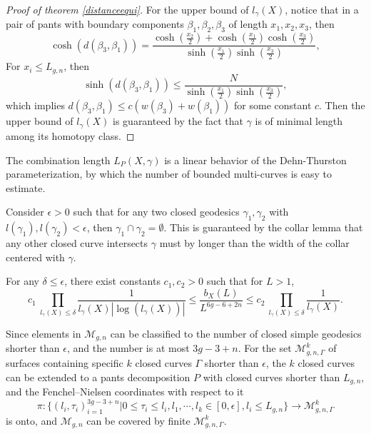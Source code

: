 \begin{proof}[Proof of theorem \ref{distanceequi}]
For the upper bound of $l_\gamma(X)$, notice that in a pair of pants with boundary components $\beta_1,\beta_2,\beta_3$ of length $x_1,x_2,x_3$, then
$$
\cosh(d(\beta_3,\beta_1))=\frac{\cosh(\frac{x_2}{2})+\cosh(\frac{x_1}{2})\cosh(\frac{x_3}{2})}{\sinh(\frac{x_1}{2})\sinh(\frac{x_3}{2})},
$$
For $x_i\leq L_{g,n}$, then 
$$
\sinh(d(\beta_3,\beta_1))\leq \frac{N}{\sinh(\frac{x_1}{2})\sinh(\frac{x_3}{2})},
$$
which implies $d(\beta_3,\beta_1)\leq c(w(\beta_3)+w(\beta_1))$ for some constant $c$. Then the upper bound of $l_\gamma(X)$ is guaranteed by the fact that $\gamma$ is of minimal  length among its homotopy class.
\end{proof}

The combination length $L_P(X,\gamma)$  is a linear behavior of the Dehn-Thurston  parameterization, by which the number of bounded multi-curves is easy to estimate.

Consider $\epsilon>0$ such that  for any two closed geodesics $\gamma_1,\gamma_2$ with $l(\gamma_1),l(\gamma_2)<\epsilon$, then $\gamma_1\cap \gamma_2=\emptyset$. This is guaranteed by the collar lemma that any other closed curve intersects $\gamma$ must by  longer than the width of the collar centered with  $\gamma$.

\begin{lemma}\label{estimatebxl}
For any $\delta\leq \epsilon$, there exist constants   $c_1,c_2>0$ such that for $L>1$, \begin{equation}
  c_1\ \prod_{l_\gamma(X)\leq \delta}\frac{1}{l_\gamma(X)|\log(l_\gamma(X))|}  
  \leq 
 \frac{b_X(L)}{L^{6g-6+2n}}
  \leq
 c_2\ \prod_{l_\gamma(X)\leq \delta}\frac{1}{l_\gamma(X)}.
\end{equation}
\end{lemma}



Since elements in  $\mathscr{M}_{g,n}$ can be classified to the number of closed simple geodesics shorter than $\epsilon$, and the number is  at most $3g-3+n$.  For the set  $\mathscr{M}_{g,n,\Gamma}^k$ of surfaces containing specific  $k$ closed curves $\Gamma$ shorter than $\epsilon$, the $k$ closed curves can be extended  to a pants decomposition $P$ with closed curves shorter than $L_{g,n}$, and the Fenchel--Nielsen coordinates with respect to it  $$
\pi\colon\{(l_i,\tau_i)_{i=1}^{3g-3+n}|0\leq \tau_i\leq l_i,l_1,\cdots, l_k\in [0,\epsilon], l_i\leq L_{g,n}\}
\to \mathscr{M}_{g,n,\Gamma}^k
$$
is onto, 
and $\mathscr{M}_{g,n}$ can be covered by finite $\mathscr{M}_{g,n,\Gamma}^k$.

